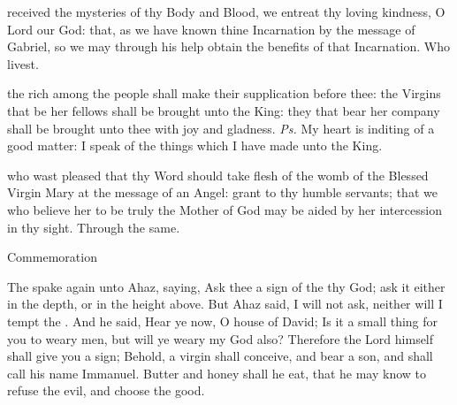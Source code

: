 
\postcommunion
{} received the mysteries of thy Body and Blood, we entreat thy loving kindness, O Lord our God: that, as we have known thine Incarnation by the message of Gabriel, so we may through his help obtain the benefits of that Incarnation. Who livest.



\introit
{} the rich among the people shall make their supplication before thee: the Virgins that be her fellows shall be brought unto the King: they that bear her company shall be brought unto thee with joy and gladness. \textit{Ps.} My heart is inditing of a good matter: I speak of the things which I have made unto the King.

\collect
{} who wast pleased that thy Word should take flesh of the womb of the Blessed Virgin Mary at the message of an Angel: grant to thy humble servants; that we who believe her to be truly the Mother of God may be aided by her intercession in thy sight. Through the same.
\begin{rubric}
    Commemoration %
\end{rubric}

 The  spake again unto Ahaz, saying, Ask thee a sign of the  thy God; ask it either in the depth, or in the height above. But Ahaz said, I will not ask, neither will I tempt the . And he said, Hear ye now, O house of David; Is it a small thing for you to weary men, but will ye weary my God also? Therefore the Lord himself shall give you a sign; Behold, a virgin shall conceive, and bear a son, and shall call his name Immanuel. Butter and honey shall he eat, that he may know to refuse the evil, and choose the good.


